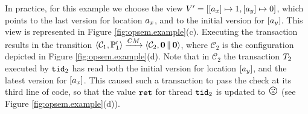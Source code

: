 \documentclass[a4paper,UKenglish]{article}%
\theoremstyle{plain}
\begin{document}
In practice, for this example we choose the view $V' = [ [a_x] \mapsto 1, [a_y] \mapsto 0]$, 
which points to the last version for location $a_x$, and to the initial version for $[a_y]$. 
This view is represented in Figure \ref{fig:opsem.example}(c). Executing the transaction 
results in the transition $\langle \mathcal{C}_1, \mathbb{P}_1' \rangle \xrightarrow{CM} \langle \mathcal{C}_2, \mathbf{0} \mathop{\lVert} \mathbf{0} \rangle$, 
where $\mathcal{C}_2$ is the configuration depicted in Figure \ref{fig:opsem.example}(d). 
Note that in $\mathcal{C}_2$ the transaction $T_2$ executed by $\mathtt{tid}_2$ has 
read both the initial version for location $[a_y]$, and the latest version for $[a_x]$. 
This caused such a transaction to pass the check at its third line of code, so that the value $\texttt{ret}$ 
for thread $\mathtt{tid}_2$ is updated to ${\Large \frownie{}}$ (see Figure \ref{fig:opsem.example}(d)).
\end{document}
